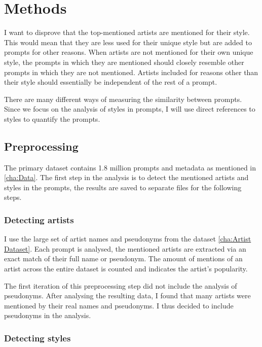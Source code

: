 \chapter{Methods}
\label{cha:Methods}

I want to disprove that the top-mentioned artists are mentioned for their style. This would mean that they are less used for their unique style but are added to prompts for other reasons.
When artists are not mentioned for their own unique style, the prompts in which they are mentioned should closely resemble other prompts in which they are not mentioned. Artists included for reasons other than their style should essentially be independent of the rest of a prompt.

There are many different ways of measuring the similarity between prompts. Since we focus on the analysis of styles in prompts, I will use direct references to styles to quantify the prompts. 


\section{Preprocessing}

The primary dataset contains 1.8 million prompts and metadata as mentioned in \ref{cha:Data}. The first step in the analysis is to detect the mentioned artists and styles in the prompts, the results are saved to separate files for the following steps.

\subsection{Detecting artists}


I use the large set of artist names and pseudonyms from the dataset \ref{cha:Artist Dataset}. Each prompt is analysed, the mentioned artists are extracted via an exact match of their full name or pseudonym. The amount of mentions of an artist across the entire dataset is counted and indicates the artist's popularity.

The first iteration of this preprocessing step did not include the analysis of pseudonyms. After analysing the resulting data, I found that many artists were mentioned by their real names and pseudonyms. I thus decided to include pseudonyms in the analysis.


\subsection{Detecting styles}


